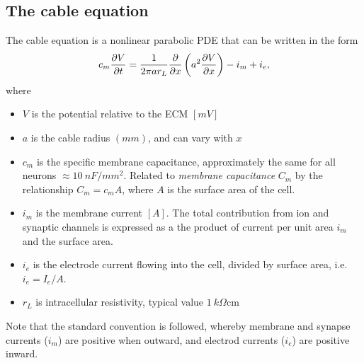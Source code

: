 \subsection{The cable equation}
The cable equation is a nonlinear parabolic PDE that can be written in the form
\begin{equation}
    \label{eq:cable}
    c_m \frac{\partial{V}}{\partial{t}} = \frac{1}{2\pi a r_{L}} \frac{\partial{}}{\partial{x}} \left( a^2 \frac{\partial{V}}{\partial{x}} \right) - i_m + i_e,
\end{equation}
where
\begin{itemize}
    \item $V$ is the potential relative to the ECM $[mV]$
    \item $a$ is the cable radius $(mm)$, and can vary with $x$
    \item $c_m$ is the {specific membrane capacitance}, approximately the same for all neurons $\approx 10~nF/mm^2$. Related to \emph{membrane capacitance} $C_m$ by the relationship $C_m=c_{m}A$, where $A$ is the surface area of the cell.
    \item $i_m$ is the membrane current $[A]$. The total contribution from ion and synaptic channels is expressed as a the product of current per unit area $i_m$ and the surface area.
    \item $i_e$ is the electrode current flowing into the cell, divided by surface area, i.e. $i_e=I_e/A$.
    \item $r_L$ is intracellular resistivity, typical value $1~k\Omega \text{cm}$
\end{itemize}

Note that the standard convention is followed, whereby membrane and synapse currents ($i_m$) are positive when outward, and electrod currents ($i_e$) are positive inward.

